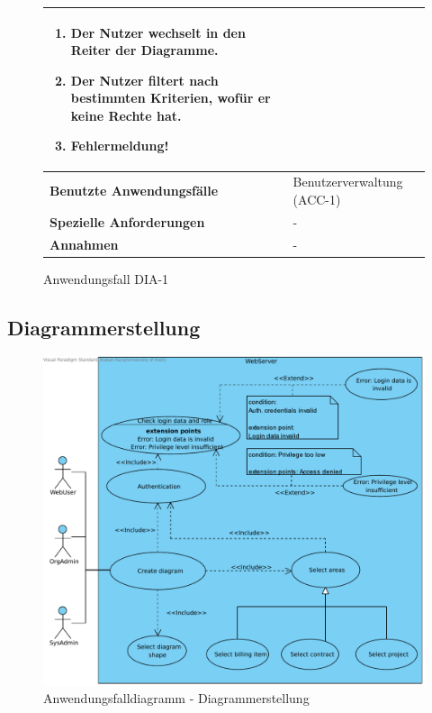 \begin{figure}[h]
\begin{tabularx}{\textwidth}{ X | X }
\begin{enumerate}
			\item Der Nutzer wechselt in den Reiter der Diagramme.
			\item Der Nutzer filtert nach bestimmten Kriterien, wofür er keine Rechte hat.
			\item Fehlermeldung!
		\end{enumerate}  \\ \hline
		\textbf{Benutzte Anwendungsfälle} & Benutzerverwaltung (ACC-1) \\ \hline
		\textbf{Spezielle Anforderungen} & - \\ \hline
		\textbf{Annahmen} & -
	\end{tabularx}
	\caption{Anwendungsfall DIA-1}
	\label{fig:anwendungsfall-diagrammdarstellung-tabelle-DIA-1}
\end{figure}

\clearpage

\subsection{Diagrammerstellung}

\begin{figure}[h]
	\centering
	\includegraphics[width=\linewidth]{img/diagrams/Create_Custom_Diagram.pdf}
	\caption{Anwendungsfalldiagramm - Diagrammerstellung}
	\label{fig:anwendungsfalldiagramm-dia-erstellung}
\end{figure}

